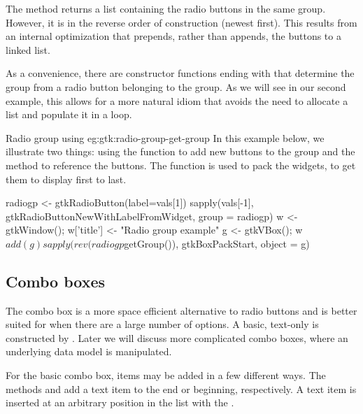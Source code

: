 The  method returns a list containing
the radio buttons in the same group. However, it is in the reverse
order of construction (newest first). This results from an internal
optimization that prepends, rather than appends, the buttons to a
linked list.

As a convenience, there are constructor functions ending with
 that determine the group from a radio button
belonging to the group. As we will see in our second example, this
allows for a more natural  idiom that avoids the need
to allocate a list and populate it in a  loop.

\begin{example}{Radio group using }{eg:gtk:radio-group-get-group}
  In this example below, we illustrate two things: using the
   function to add new
  buttons to the group and the 
  method to reference the buttons. The  function is used
  to pack the widgets, to get them to display first to last.
\begin{Schunk}
\begin{Sinput}
 radiogp <- gtkRadioButton(label=vals[1])
 sapply(vals[-1], gtkRadioButtonNewWithLabelFromWidget, 
        group = radiogp)
 w <- gtkWindow(); 
 w['title'] <- "Radio group example"
 g <- gtkVBox(); w$add(g)
 sapply(rev(radiogp$getGroup()), gtkBoxPackStart, object = g)
\end{Sinput}
\end{Schunk}
\end{example}



\subsection{Combo boxes}
\label{sec:RGtk2:basic-combobox}

The combo box is a more space efficient alternative to radio buttons
and is better suited for when there are a large number of options. A
basic, text-only  is constructed by
. Later we will discuss more
complicated combo boxes, where an underlying data model is
manipulated.

For the basic combo box, items may be added in a few different ways.
The methods  and
 add a text item to the end or
beginning, respectively.  A text item is inserted at an arbitrary
position in the list with the .

